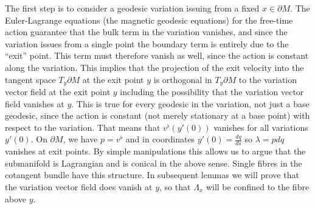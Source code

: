 \documentclass[12pt]{amsart}
\numberwithin{equation}{section}
\begin{document}
The first step is to consider a geodesic variation issuing from a fixed $x\in \partial M$. The Euler-Lagrange equations (the magnetic geodesic equations) for the free-time action guarantee that the bulk term in the variation vanishes, and since the variation issues from a single point the boundary term is entirely due to the ``exit'' point. This term must therefore vanish as well, since the action is constant along the variation. This implies that the projection of the exit velocity into the tangent space $T_y\partial M$ at the exit point $y$ is orthogonal in $T_y\partial M$ to the variation vector field at the exit point $y$ including the possibility that the variation vector field vanishes at $y$. This is true for every geodesic in the variation, not just a base geodesic, since the action is constant (not merely stationary at a base point) with respect to the variation. That means that $v^{
\flat}(y'(0))$ vanishes for all variations $y'(0)$. On $\partial M$, we have $p=v^{\flat}$ and in coordinates $y'(0)=\frac{dq}{ds}$ so $\lambda=pdq$ vanishes at exit points. By simple manipulations this allows us to argue that the submanifold is Lagrangian and is conical in the above sense. Single fibres in the cotangent bundle have this structure. In subsequent lemmas we will prove that the variation vector field does vanish at $y$, so that $\Lambda_x$ will be confined to the fibre above $y$.
\end{document}
